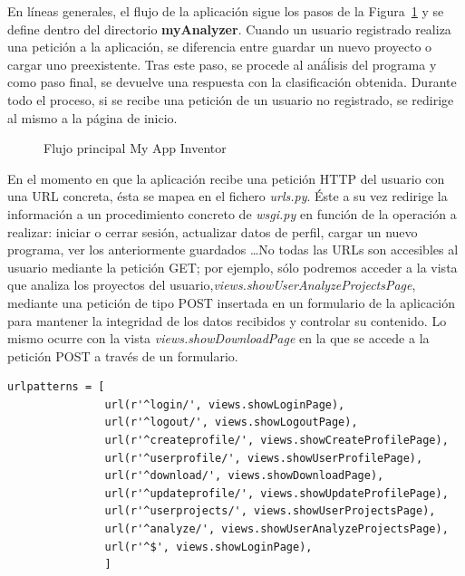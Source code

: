 \documentclass[a4paper, 12pt]{book}
\begin{document}
En líneas generales, el flujo de la aplicación sigue los pasos de la Figura~\ref{fig:flujoapp} y se define dentro del directorio \textbf{myAnalyzer}. Cuando un usuario registrado realiza una petición a la aplicación, se diferencia entre guardar un nuevo proyecto o cargar uno preexistente. Tras este paso, se procede al anáĺisis del programa y como paso final, se devuelve una respuesta con la clasificación obtenida. Durante todo el proceso, si se recibe una petición de un usuario no registrado, se redirige al mismo a la página de inicio. 
\begin{figure}[H]
  \centering
  \caption{Flujo principal My App Inventor}
  \label{fig:flujoapp}
\end{figure}
En el momento en que la aplicación recibe una petición HTTP del usuario con una URL concreta, ésta se mapea en el fichero \textit{urls.py}. Éste a su vez redirige la información a un procedimiento concreto de \textit{wsgi.py} en función de la operación a realizar: iniciar o cerrar sesión, actualizar datos de perfil, cargar un nuevo programa, ver los anteriormente guardados \ldots No todas las URLs son accesibles al usuario mediante la petición GET; por ejemplo, sólo podremos acceder a la vista que analiza los proyectos del usuario,\textit{views.showUserAnalyzeProjectsPage}, mediante una petición de tipo POST insertada en un formulario de la aplicación para mantener la integridad de los datos recibidos y controlar su contenido. Lo mismo ocurre con la vista \textit{views.showDownloadPage} en la que se accede a la petición POST a través de un formulario.
\begin{lstlisting}
urlpatterns = [
               url(r'^login/', views.showLoginPage),
               url(r'^logout/', views.showLogoutPage),
               url(r'^createprofile/', views.showCreateProfilePage),
               url(r'^userprofile/', views.showUserProfilePage),
               url(r'^download/', views.showDownloadPage),
               url(r'^updateprofile/', views.showUpdateProfilePage),
               url(r'^userprojects/', views.showUserProjectsPage),
               url(r'^analyze/', views.showUserAnalyzeProjectsPage),
               url(r'^$', views.showLoginPage),
               ]
\end{lstlisting}
\end{document}
